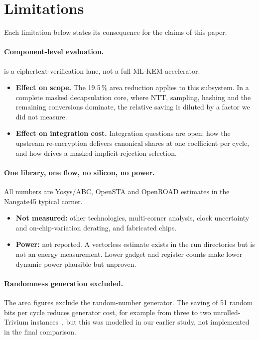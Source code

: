 \section{Limitations}\label{sec:limits}
Each limitation below states its consequence for the claims of this paper.

\paragraph{Component-level evaluation.} \PAMS{} is a ciphertext-verification lane, not a full ML-KEM accelerator.
\begin{itemize}
  \item \textbf{Effect on scope.} The 19.5\,\% area reduction applies to this subsystem. In a complete masked decapsulation core, where NTT, sampling, hashing and the remaining conversions dominate, the relative saving is diluted by a factor we did not measure.
  \item \textbf{Effect on integration cost.} Integration questions are open: how the upstream re-encryption delivers canonical shares at one coefficient per cycle, and how  drives a masked implicit-rejection selection.
\end{itemize}

\paragraph{One library, one flow, no silicon, no power.} All numbers are Yosys/ABC, OpenSTA and OpenROAD estimates in the Nangate45 typical corner.
\begin{itemize}
  \item \textbf{Not measured:} other technologies, multi-corner analysis, clock uncertainty and on-chip-variation derating, and fabricated chips.
  \item \textbf{Power:} not reported. A vectorless estimate exists in the run directories but is not an energy measurement. Lower gadget and register counts make lower dynamic power plausible but unproven.
\end{itemize}

\paragraph{Randomness generation excluded.} The area figures exclude the random-number generator. The saving of 51 random bits per cycle reduces generator cost, for example from three to two unrolled-Trivium instances~\cite{cassiers2024rng}, but this was modelled in our earlier study, not implemented in the final comparison.

